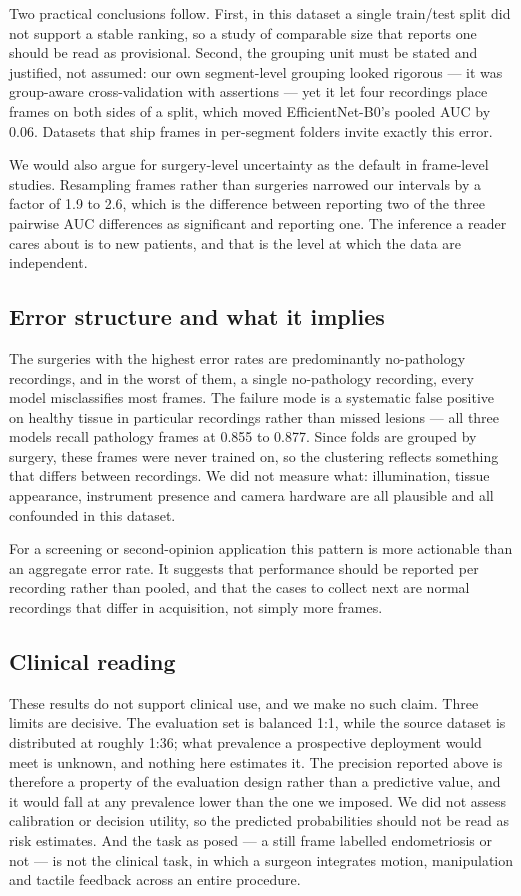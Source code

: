\documentclass[preprint,12pt]{elsarticle}
\begin{document}
Two practical conclusions follow. First, in this dataset a single train/test split did not support a stable ranking, so a study of comparable size that reports one should be read as provisional. Second, the grouping unit must be stated and justified, not assumed: our own segment-level grouping looked rigorous --- it was group-aware cross-validation with assertions --- yet it let four recordings place frames on both sides of a split, which moved EfficientNet-B0's pooled AUC by 0.06. Datasets that ship frames in per-segment folders invite exactly this error.

We would also argue for surgery-level uncertainty as the default in frame-level studies. Resampling frames rather than surgeries narrowed our intervals by a factor of 1.9 to 2.6, which is the difference between reporting two of the three pairwise AUC differences as significant and reporting one. The inference a reader cares about is to new patients, and that is the level at which the data are independent.

\subsection{Error structure and what it implies}

The surgeries with the highest error rates are predominantly no-pathology recordings, and in the worst of them, a single no-pathology recording, every model misclassifies most frames. The failure mode is a systematic false positive on healthy tissue in particular recordings rather than missed lesions --- all three models recall pathology frames at 0.855 to 0.877. Since folds are grouped by surgery, these frames were never trained on, so the clustering reflects something that differs between recordings. We did not measure what: illumination, tissue appearance, instrument presence and camera hardware are all plausible and all confounded in this dataset.

For a screening or second-opinion application this pattern is more actionable than an aggregate error rate. It suggests that performance should be reported per recording rather than pooled, and that the cases to collect next are normal recordings that differ in acquisition, not simply more frames.

\subsection{Clinical reading}

These results do not support clinical use, and we make no such claim. Three limits are decisive. The evaluation set is balanced 1:1, while the source dataset is distributed at roughly 1:36; what prevalence a prospective deployment would meet is unknown, and nothing here estimates it. The precision reported above is therefore a property of the evaluation design rather than a predictive value, and it would fall at any prevalence lower than the one we imposed. We did not assess calibration or decision utility, so the predicted probabilities should not be read as risk estimates. And the task as posed --- a still frame labelled endometriosis or not --- is not the clinical task, in which a surgeon integrates motion, manipulation and tactile feedback across an entire procedure.
\end{document}
